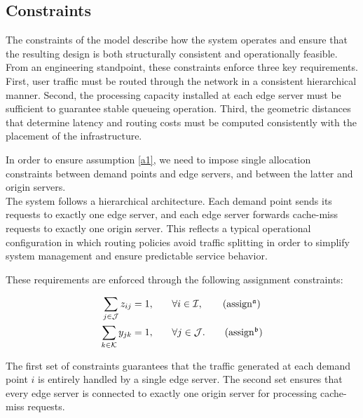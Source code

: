 \documentclass[a4paper,11pt,reqno]{amsart}
\newcommand{\K}{\mathcal{K}}
\newcommand{\I}{\mathcal{I}}
\newcommand{\J}{\mathcal{J}}
\begin{document}
\subsection*{Constraints}

The constraints of the model describe how the system operates and ensure that the resulting design is both structurally consistent and operationally feasible. From an engineering standpoint, these constraints enforce three key requirements. First, user traffic must be routed through the network in a consistent hierarchical manner. Second, the processing capacity installed at each edge server must be sufficient to guarantee stable queueing operation. Third, the geometric distances that determine latency and routing costs must be computed consistently with the placement of the infrastructure.

In order to ensure assumption \ref{a1}, we need to impose single allocation constraints between demand points and edge servers, and between the latter and origin servers.\\

 The system follows a hierarchical architecture. Each demand point sends its requests to exactly one edge server, and each edge server forwards cache-miss requests to exactly one origin server. This reflects a typical operational configuration in which routing policies avoid traffic splitting in order to simplify system management and ensure predictable service behavior.

These requirements are enforced through the following assignment constraints:

\begin{align}
    \sum_{j \in \J} z_{ij} = 1, 
    & \qquad \forall i \in \I, \label{assign:edge}\tag{assign$^{\frak a}$}\\
    \sum_{k \in \K} y_{jk} = 1, 
    & \qquad \forall j \in \J.\label{assign:origin}\tag{assign$^{\frak b}$}
\end{align}

The first set of constraints guarantees that the traffic generated at each demand point $i$ is entirely handled by a single edge server. The second set ensures that every edge server is connected to exactly one origin server for processing cache-miss requests.
\end{document}
